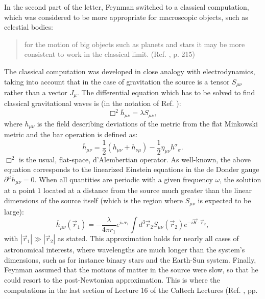 \documentclass{ws-procs961x669}            %
\begin{document}
In the second part of the letter, Feynman switched to a classical
computation, which was considered to be more appropriate for
macroscopic objects, such as celestial bodies:
%
\begin{quote}
for the motion of big objects such as planets and stars it may be
more consistent to work in the classical limit. (Ref.
, p. 215)
\end{quote}
%
The classical computation was developed in close analogy with
electrodynamics, taking into account that in the case of
gravitation the source is a tensor $S_{\mu\nu}$ rather than a
vector $J_{\mu}$. The differential equation which has to be solved
to find classical gravitational waves is (in the notation of Ref.
):
%
\begin{equation}\label{waves1}
\Box^2 \overline{h}_{\mu\nu}=\lambda S_{\mu\nu},
\end{equation}
%
where $h_{\mu\nu}$ is the field describing deviations of the
metric from the flat Minkowski metric and the bar operation is
defined as:
%
\begin{equation} \label{barOperation}
\overline{h}_{\mu\nu}=\frac{1}{2} \left( h_{\mu\nu} + h_{\nu\mu}
\right) - \frac{1}{2} \eta_{\mu\nu} {h^{\sigma}}_{\sigma}.
\end{equation}
%
$\Box^2$ is the usual, flat-space, d'Alembertian operator. As
well-known, the above equation corresponds to the linearized
Einstein equations in the de Donder gauge
$\partial^{\mu}\overline{h}_{\mu\nu}=0$. When all quantities are
periodic with a given frequency $\omega$, the solution at a point
$1$ located at a distance from the source much greater than the
linear dimensions of the source itself (which is the region where
$S_{\mu\nu}$ is expected to be large):
%
\begin{equation}\label{SolWaves1}
\overline{h}_{\mu\nu}(\vec r_1)=- \frac{\lambda}{4\pi r_1} e^{i
\omega r_1} \int d^3 \vec r_2 S_{\mu\nu}(\vec r_2) e^{-i \vec K
\cdot \vec r_2},
\end{equation}
%
with $|\vec r_1|\gg |\vec r_2|$ as stated. This approximation
holds for nearly all cases of astronomical interests, where
wavelengths are much longer than the system's dimensions, such as
for instance binary stars and the Earth-Sun system. Finally,
Feynman assumed that the motions of matter in the source were
slow, so that he could resort to the post-Newtonian approximation.
This is where the computations in the last section of Lecture 16
of the Caltech Lectures (Ref. , pp.
\end{document}
